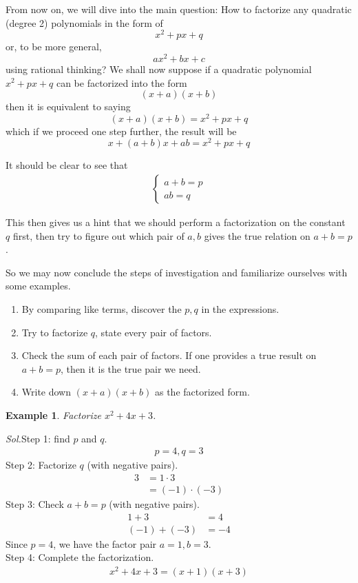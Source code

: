 \documentclass[12pt]{article}
\newtheorem{example}{Example}
\begin{document}
    From now on, we will dive into the main question: How to factorize any quadratic (degree 2) polynomials in the form of $$x^2+px+q$$ or, to be more general, $$ax^2+bx+c$$ using rational thinking? We shall now suppose if a quadratic polynomial $x^2+px+q$ can be factorized into the form $$(x+a)(x+b)$$ then it is equivalent to saying $$(x+a)(x+b)=x^2+px+q$$ which if we proceed one step further, the result will be $$x+(a+b)x+ab=x^2+px+q$$

    It should be clear to see that \begin{align*}
        \begin{cases}
            a+b=p\\
            ab=q
        \end{cases}
    \end{align*}

    This then gives us a hint that we should perform a factorization on the constant $q$ first, then try to figure out which pair of $a,b$ gives the true relation on $a+b=p$.

    So we may now conclude the steps of investigation and familiarize ourselves with some examples.\begin{enumerate}
        \item By comparing like terms, discover the $p,q$ in the expressions.
        \item Try to factorize $q$, state every pair of factors.
        \item Check the sum of each pair of factors. If one provides a true result on $a+b=p$, then it is the true pair we need.
        \item Write down $(x+a)(x+b)$ as the factorized form.
    \end{enumerate}

    \begin{example}
        Factorize $x^2+4x+3$.
    \end{example}

    \textit{ Sol.}Step 1: find $p$ and $q$.
    \begin{align*}
        p=4, q=3
    \end{align*}
    \indent \indent Step 2: Factorize $q$ (with negative pairs).
    \begin{align*}
        3&=1\cdot 3\\
        &=(-1)\cdot(-3)
    \end{align*}
    \indent \indent Step 3: Check $a+b=p$ (with negative pairs).
    \begin{align*}
        1+3&=4\\
        (-1)+(-3)&=-4
    \end{align*}
    \indent \indent \indent Since $p=4$, we have the factor pair $a=1,b=3$.\\
    \indent \indent Step 4: Complete the factorization.
    \begin{align*}
        x^2+4x+3=(x+1)(x+3)
    \end{align*}
\end{document}
